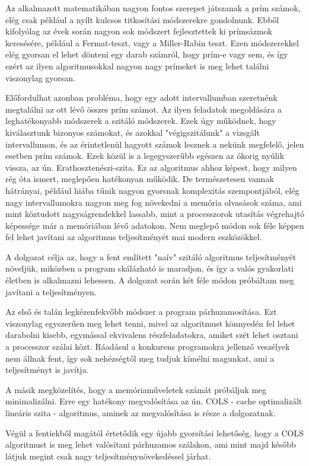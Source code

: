 \documentclass[twoside, a4paper, 12pt]{article}
\begin{document}
Az alkalmazott matematikában nagyon fontos szerepet játszanak a prím számok, elég csak például a nyílt kulcsos titkosítási módszerekre gondolnunk. Ebből kifolyólag az évek során nagyon sok módszert fejlesztettek ki prímsázmok keresésére, például a Fermat-teszt, vagy a Miller-Rabin teszt. Ezen módszerekkel elég gyorsan el lehet dönteni egy darab számról, hogy prím-e vagy sem, és így ezért az ilyen algoritmusokkal nagyon nagy prímeket is meg lehet találni viszonylag gyorsan. \par
Előfordulhat azonban probléma, hogy egy adott intervallumban szeretnénk megtalálni az ott lévő összes prím számot. Az ilyen feladatok megoldására a leghatékonyabb módszerek a szitáló módszerek. Ezek úgy működnek, hogy kiválasztunk bizonyos számokat, és azokkal "végigszitálunk" a vizsgált intervallumon, és az érintetlenül hagyott számok lesznek a nekünk megfelelő, jelen esetben prím számok. Ezek közül is a legegyszerűbb egészen az ókorig nyúlik vissza, az ún. Erathosztenészi-szita. Ez az algoritmus ahhoz képest, hogy milyen rég óta ismert, meglepően hatékonyan működik. De természetesen vannak hátrányai, például hiába tűnik nagyon gyorsnak komplexitás szempontjából, elég nagy intervallumokra nagyon meg fog növekedni a memória olvasások száma, ami mint köztudott nagyságrendekkel lassabb, mint a processzorok utasítás végrehajtó képessége már a memóriában lévő adatokon. Nem meglepő módon sok féle képpen fel lehet javítani az algoritmus teljesítményét mai modern eszközökkel. \par
A dolgozat célja az, hogy a fent említett "naív" szitáló algoritmus teljesítményét növeljük, miközben a program skálázható is maradjon, és így a valós gyakorlati életben is alkalmazni lehessen. A dolgozat során két féle módon próbáltam meg javítani a teljesítményen.\par
Az első és talán legkézenfekvőbb módszer a program párhuzamosítása. Ezt viszonylag egyszerűen meg lehet tenni, mivel az algoritmust könnyedén fel lehet darabolni kisebb, egymással ekvivalens részfeladatokra, amiket szét lehet osztani a processzor szálai közt. Ráadásul a konkurens programokra jellenző veszélyek nem állnak fent, így sok nehézségtől meg tudjuk kímélni magunkat, ami a teljesítményt is javítja. \par
A másik megközelítés, hogy a memóriaműveletek számát próbáljuk meg minimalizálni. Erre egy hatékony megvalósítása az ún. COLS - cache optimalizált lineáris szita - algoritmus, aminek az megvalósítása is része a dolgozatnak.\par
Végül a fentiekből magától értetődik egy újabb gyorsítási lehetőség, hogy a COLS algoritmust is meg lehet valósítani párhuzamos szálakon, ami mint majd később látjuk megint csak nagy teljesítménynövekedéssel járhat.\par
\end{document}
